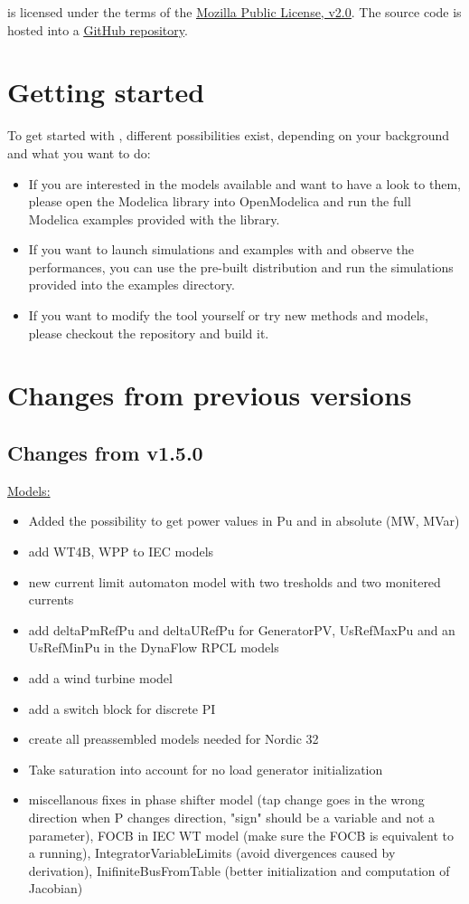 \documentclass[a4paper, 12pt]{report}
\begin{document}
\Dynawo is licensed under the terms of the \href{http://mozilla.org/MPL/2.0}{\underline{Mozilla Public License, v2.0}}.
The source code is hosted into a \href{https://github.com/dynawo/dynawo} {\underline{GitHub repository}}. \\

\section{Getting started}

To get started with \Dynawo , different possibilities exist, depending on your background and what you want to do:
\begin{itemize}
\item If you are interested in the models available and want to have a look to them, please open the \Dynawo Modelica library into OpenModelica and run the full Modelica examples provided with the library.
\item If you want to launch simulations and examples with \Dynawo and observe the performances, you can use the pre-built distribution and run the simulations provided into the examples directory.
\item If you want to modify the tool yourself or try new methods and models, please checkout the repository and build it.
\end{itemize}

\section{Changes from previous versions}

\subsection{Changes from v1.5.0}

\underline{Models:}

\begin{itemize}
\item Added the possibility to get power values in Pu and in absolute (MW, MVar)
\item add WT4B, WPP to IEC models
\item new current limit automaton model with two tresholds and two monitered currents
\item add deltaPmRefPu and deltaURefPu for GeneratorPV, UsRefMaxPu and an UsRefMinPu in the DynaFlow RPCL models
\item add a wind turbine model
\item add a switch block for discrete PI
\item create all preassembled models needed for Nordic 32
\item Take saturation into account for no load generator initialization
\item miscellanous fixes in phase shifter model (tap change goes in the wrong direction when P changes direction, "sign" should be a variable and not a parameter), FOCB in IEC WT model (make sure the FOCB is equivalent to a running), IntegratorVariableLimits (avoid divergences caused by derivation), InifiniteBusFromTable (better initialization and computation of Jacobian)
\end{itemize}
\end{document}

